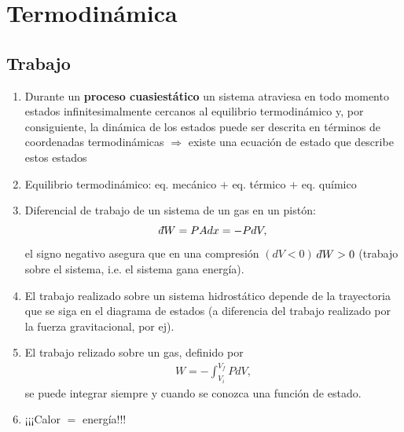 \chapter{Termodinámica}
\section{Trabajo}
\begin{enumerate}
\item Durante un \textbf{proceso cuasiestático} un sistema atraviesa 
		en todo momento 
	  estados infinitesimalmente cercanos al equilibrio termodinámico y, 
	  por consiguiente, la dinámica de los estados puede ser descrita
	  en términos de coordenadas termodinámicas $\Rightarrow$ existe 
	  una ecuación de estado que describe estos estados 
\item Equilibrio termodinámico: eq. mecánico $+$ eq. térmico $+$ 
 	  eq. químico
\item Diferencial de trabajo de un sistema de un gas en un pistón:
\begin{equation}
\dbar W= PAdx = -PdV,
\end{equation}
el signo negativo asegura que en una compresión $(dV<0)$ $\dbar W>0$ 
(trabajo sobre el sistema, i.e. el sistema gana energía). 
\item El trabajo realizado sobre un sistema hidrostático depende de 
la trayectoria que se siga en el diagrama de estados (a diferencia
del trabajo realizado por la fuerza gravitacional, por ej). 
\item El trabajo relizado sobre un gas, definido por
\begin{align*}
W=-\int_{V_i}^{V_f} PdV, 
\end{align*}
se puede integrar siempre y cuando se conozca una función 
de estado.
\item ¡¡¡Calor $=$ energía!!!
\end{enumerate}

